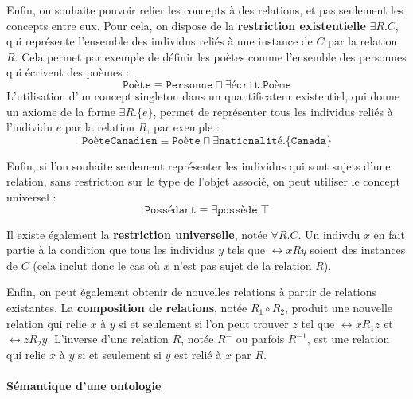 Enfin, on souhaite pouvoir relier les concepts à des relations, et pas seulement les concepts entre eux. Pour cela, on dispose de la \textbf{restriction existentielle} $\exists R.C$, qui représente l'ensemble des individus reliés à une instance de $C$ par la relation $R$. Cela permet par exemple de définir les poètes comme l'ensemble des personnes qui écrivent des poèmes :
\begin{equation}
    \texttt{Poète} \equiv \texttt{Personne} \sqcap \exists \texttt{écrit}.\texttt{Poème}
\end{equation}
L'utilisation d'un concept singleton dans un quantificateur existentiel, qui donne un axiome de la forme $\exists R.\{ e \}$, permet de représenter tous les individus reliés à l'individu $e$ par la relation $R$, par exemple :
\begin{equation}
    \texttt{PoèteCanadien} \equiv \texttt{Poète} \sqcap \exists  \texttt{nationalité}. \{\texttt{Canada} \}
\end{equation}

Enfin, si l'on souhaite seulement représenter les individus qui sont sujets d'une relation, sans restriction sur le type de l'objet associé, on peut utiliser le concept universel :
\begin{equation}
    \texttt{Possédant} \equiv \exists \texttt{possède}.\top
\end{equation}

Il existe également la \textbf{restriction universelle}, notée $\forall R.C$. Un indivdu $x$ en fait partie à la condition que tous les individus $y$ tels que $\rel{x}{R}{y}$ %
soient des instances de $C$ (cela inclut donc le cas où $x$ n'est pas sujet de la relation $R$).

Enfin, on peut également obtenir de nouvelles relations à partir de relations existantes. La \textbf{composition de relations}, notée $R_1 \circ R_2$, produit une nouvelle relation qui relie $x$ à $y$ si et seulement si l'on peut trouver $z$ tel que $\rel{x}{R_1}{z}$ et $\rel{z}{R_2}{y}$. L'inverse d'une relation $R$, notée $R^-$ ou parfois $R^{-1}$, est une relation qui relie $x$ à $y$ si et seulement si $y$ est relié à $x$ par $R$.


\paragraph{Sémantique d'une ontologie}



